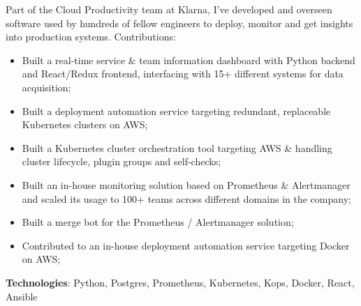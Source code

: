 \documentclass[12pt,legalpaper,sans]{moderncv}        %
\begin{document}
    {\begin{minipage}[t]{\linewidth}\small{Part of the Cloud Productivity team at Klarna, I've developed and overseen software used by hundreds of fellow engineers to deploy, monitor and get insights into production systems.\newline{}
    Contributions:
        \begin{itemize}
            \item Built a real-time service \& team information dashboard with Python backend and React/Redux frontend, interfacing with 15+ different systems for data acquisition;
            \item Built a deployment automation service targeting redundant, replaceable Kubernetes clusters on AWS;
            \item Built a Kubernetes cluster orchestration tool targeting AWS \& handling cluster lifecycle, plugin groups and self-checks;
            \item Built an in-house monitoring solution based on Prometheus \& Alertmanager and scaled its usage to 100+ teams across different domains in the company;
            \item Built a merge bot for the Prometheus / Alertmanager solution;
            \item Contributed to an in-house deployment automation service targeting Docker on AWS;
        \end{itemize}
        \textbf{Technologies}: Python, Postgres, Prometheus, Kubernetes, Kops, Docker, React, Ansible\newline}\end{minipage}}
\end{document}
